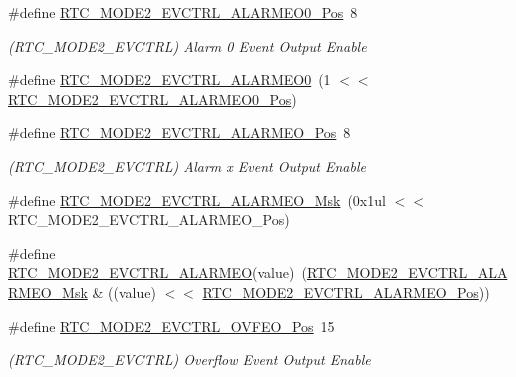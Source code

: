\begin{DoxyCompactItemize}
\#define \mbox{\hyperlink{group___s_a_m_d21___r_t_c_ga645fe312dccbd20f42dc01a8592b181e}{R\+T\+C\+\_\+\+M\+O\+D\+E2\+\_\+\+E\+V\+C\+T\+R\+L\+\_\+\+A\+L\+A\+R\+M\+E\+O0\+\_\+\+Pos}}~8
\begin{DoxyCompactList}\small\item\em (R\+T\+C\+\_\+\+M\+O\+D\+E2\+\_\+\+E\+V\+C\+T\+RL) Alarm 0 Event Output Enable \end{DoxyCompactList}\item 
\#define \mbox{\hyperlink{group___s_a_m_d21___r_t_c_ga9bf18dec027f214ac901472266166530}{R\+T\+C\+\_\+\+M\+O\+D\+E2\+\_\+\+E\+V\+C\+T\+R\+L\+\_\+\+A\+L\+A\+R\+M\+E\+O0}}~(1 $<$$<$ \mbox{\hyperlink{group___s_a_m_d21___r_t_c_ga645fe312dccbd20f42dc01a8592b181e}{R\+T\+C\+\_\+\+M\+O\+D\+E2\+\_\+\+E\+V\+C\+T\+R\+L\+\_\+\+A\+L\+A\+R\+M\+E\+O0\+\_\+\+Pos}})
\item 
\#define \mbox{\hyperlink{group___s_a_m_d21___r_t_c_gae505cc719343ed5fc7d59e19b1eafab8}{R\+T\+C\+\_\+\+M\+O\+D\+E2\+\_\+\+E\+V\+C\+T\+R\+L\+\_\+\+A\+L\+A\+R\+M\+E\+O\+\_\+\+Pos}}~8
\begin{DoxyCompactList}\small\item\em (R\+T\+C\+\_\+\+M\+O\+D\+E2\+\_\+\+E\+V\+C\+T\+RL) Alarm x Event Output Enable \end{DoxyCompactList}\item 
\#define \mbox{\hyperlink{group___s_a_m_d21___r_t_c_ga226b111bd167fd4c6309284acb18885c}{R\+T\+C\+\_\+\+M\+O\+D\+E2\+\_\+\+E\+V\+C\+T\+R\+L\+\_\+\+A\+L\+A\+R\+M\+E\+O\+\_\+\+Msk}}~(0x1ul $<$$<$ R\+T\+C\+\_\+\+M\+O\+D\+E2\+\_\+\+E\+V\+C\+T\+R\+L\+\_\+\+A\+L\+A\+R\+M\+E\+O\+\_\+\+Pos)
\item 
\#define \mbox{\hyperlink{group___s_a_m_d21___r_t_c_gaea51360c2d627b35b8bad72f1e1af9e1}{R\+T\+C\+\_\+\+M\+O\+D\+E2\+\_\+\+E\+V\+C\+T\+R\+L\+\_\+\+A\+L\+A\+R\+M\+EO}}(value)~(\mbox{\hyperlink{group___s_a_m_d21___r_t_c_ga226b111bd167fd4c6309284acb18885c}{R\+T\+C\+\_\+\+M\+O\+D\+E2\+\_\+\+E\+V\+C\+T\+R\+L\+\_\+\+A\+L\+A\+R\+M\+E\+O\+\_\+\+Msk}} \& ((value) $<$$<$ \mbox{\hyperlink{group___s_a_m_d21___r_t_c_gae505cc719343ed5fc7d59e19b1eafab8}{R\+T\+C\+\_\+\+M\+O\+D\+E2\+\_\+\+E\+V\+C\+T\+R\+L\+\_\+\+A\+L\+A\+R\+M\+E\+O\+\_\+\+Pos}}))
\item 
\#define \mbox{\hyperlink{group___s_a_m_d21___r_t_c_ga619ad62637b545ab04896513ade68db7}{R\+T\+C\+\_\+\+M\+O\+D\+E2\+\_\+\+E\+V\+C\+T\+R\+L\+\_\+\+O\+V\+F\+E\+O\+\_\+\+Pos}}~15
\begin{DoxyCompactList}\small\item\em (R\+T\+C\+\_\+\+M\+O\+D\+E2\+\_\+\+E\+V\+C\+T\+RL) Overflow Event Output Enable \end{DoxyCompactList}\item 
$$
\end{DoxyCompactItemize}
